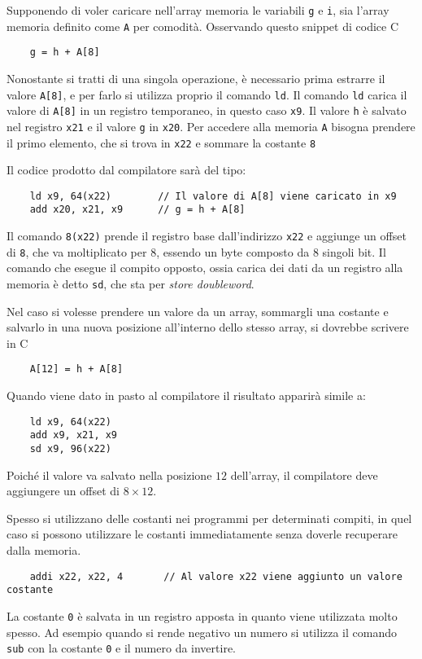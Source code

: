 \documentclass[a4paper,12pt]{article}
\theoremstyle{break}
\newcommand{\code}[1]{\texttt{#1}}
\numberwithin{equation}{section}
\begin{document}
Supponendo di voler caricare nell'array memoria le variabili \code{g} e \code{i}, sia l'array memoria definito come \code{A} per comodità. Osservando questo snippet di codice C
\begin{verbatim}
    g = h + A[8]
\end{verbatim}
Nonostante si tratti di una singola operazione, è necessario prima estrarre il valore \code{A[8]}, e per farlo si utilizza proprio il comando \code{ld}.
Il comando \code{ld} carica il valore di \code{A[8]} in un registro temporaneo, in questo caso \code{x9}. Il valore \code{h} è salvato nel registro \code{x21} e il valore \code{g} in \code{x20}. Per accedere alla memoria \code{A} bisogna prendere il primo elemento, che si trova in \code{x22} e sommare la costante \code{8}

Il codice prodotto dal compilatore sarà del tipo:
\begin{verbatim}
    ld x9, 64(x22)        // Il valore di A[8] viene caricato in x9
    add x20, x21, x9      // g = h + A[8]
\end{verbatim}
Il comando \code{8(x22)} prende il registro base dall'indirizzo \code{x22} e aggiunge un offset di \code{8}, che va moltiplicato per \(8\), essendo un byte composto da \(8\) singoli bit.
Il comando che esegue il compito opposto, ossia carica dei dati da un registro alla memoria è detto \code{sd}, che sta per \textit{store doubleword}. 

Nel caso si volesse prendere un valore da un array, sommargli una costante e salvarlo in una nuova posizione all'interno dello stesso array, si dovrebbe scrivere in C
\begin{verbatim}
    A[12] = h + A[8]
\end{verbatim}
Quando viene dato in pasto al compilatore il risultato apparirà simile a:
\begin{verbatim}
    ld x9, 64(x22)
    add x9, x21, x9
    sd x9, 96(x22)
\end{verbatim}
Poiché il valore va salvato nella posizione \(12\) dell'array, il compilatore deve aggiungere un offset di \(8 \times 12\).

Spesso si utilizzano delle costanti nei programmi per determinati compiti, in quel caso si possono utilizzare le costanti immediatamente senza doverle recuperare dalla memoria. 
\begin{verbatim}
    addi x22, x22, 4       // Al valore x22 viene aggiunto un valore costante   
\end{verbatim}
La costante \code{0} è salvata in un registro apposta in quanto viene utilizzata molto spesso. Ad esempio quando si rende negativo un numero si utilizza il comando \code{sub} con la costante \code{0} e il numero da invertire.
\end{document}
